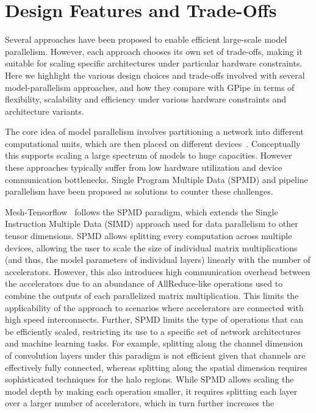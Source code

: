 \documentclass{article}
\def\codename{GPipe}
\begin{document}
\section{Design Features and Trade-Offs}


Several approaches have been proposed to enable efficient large-scale model parallelism. However, each approach chooses its own set of trade-offs, making it suitable for scaling specific architectures under particular hardware constraints. Here we highlight the various design choices and trade-offs involved with several model-parallelism approaches, and how they compare with \codename{} in terms of flexibility, scalability and efficiency under various hardware constraints and architecture variants.



The core idea of model parallelism involves partitioning a network into different computational units, which are then placed on different devices~\cite{krizhevsky2014one, lee2014model, mirhoseini2017device,dean12disbelief}. Conceptually this supports scaling a large spectrum of models to huge capacities. However these approaches typically suffer from low hardware utilization and device communication bottlenecks. Single Program Multiple Data (SPMD) and pipeline parallelism have been proposed as solutions to counter these challenges.


Mesh-Tensorflow~\cite{shazeer2018mesh} follows the SPMD paradigm, which extends the Single Instruction Multiple Data (SIMD) approach used for data parallelism to other tensor dimensions. SPMD allows splitting every computation across multiple devices, allowing the user to scale the size of individual matrix multiplications (and thus, the model parameters of individual layers) linearly with the number of accelerators. However, this also introduces high communication overhead between the accelerators due to an abundance of AllReduce-like operations used to combine the outputs of each parallelized matrix multiplication. This limits the applicability of the approach to scenarios where accelerators are connected with high speed interconnects. Further, SPMD limits the type of operations that can be efficiently scaled, restricting its use to a specific set of network architectures and machine learning tasks. For example, splitting along the channel dimension of convolution layers under this paradigm is not efficient given that channels are effectively fully connected, whereas splitting along the spatial dimension requires sophisticated techniques for the halo regions. While SPMD allows scaling the model depth by making each operation smaller, it requires splitting each layer over a larger number of accelerators, which in turn further increases the communication overhead across devices.
\end{document}
